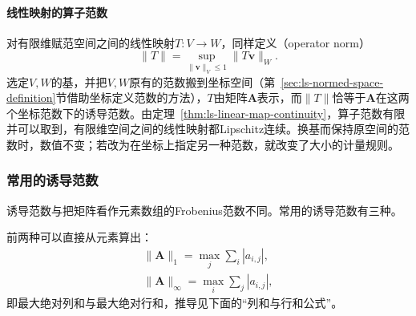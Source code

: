\paragraph{线性映射的算子范数}
对有限维赋范空间之间的线性映射$T:V\to W$，同样定义（operator norm）
\[
 \lVert T\rVert=\sup_{\lVert\bm v\rVert_V\leq1}\lVert T\bm v\rVert_W .
\]
选定$V,W$的基，并把$V,W$原有的范数搬到坐标空间（第~\ref{sec:ls-normed-space-definition}节借助坐标定义范数的方法），$T$由矩阵$\bm A$表示，而$\lVert T\rVert$恰等于$\bm A$在这两个坐标范数下的诱导范数。由定理~\ref{thm:ls-linear-map-continuity}，算子范数有限并可以取到，有限维空间之间的线性映射都Lipschitz连续。换基而保持原空间的范数时，数值不变；若改为在坐标上指定另一种范数，就改变了大小的计量规则。

\subsubsection{常用的诱导范数}
\label{sec:ls-common-induced-norms}

诱导范数与把矩阵看作元素数组的Frobenius范数不同。常用的诱导范数有三种。

前两种可以直接从元素算出：
\[
 \begin{gathered}
 \lVert\bm A\rVert_1=\max_j\sum_i|a_{i,j}|,\\
 \lVert\bm A\rVert_\infty=\max_i\sum_j|a_{i,j}|,
 \end{gathered}
\]
即最大绝对列和与最大绝对行和，推导见下面的“列和与行和公式”。

